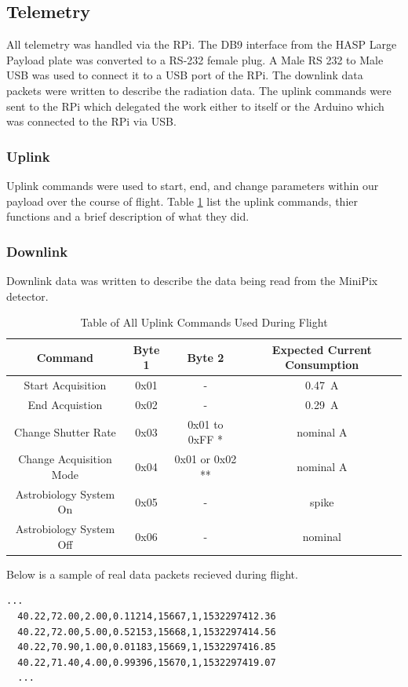\subsection{Telemetry}
\label{sec:Telemetry}

All telemetry was handled via the RPi. The DB9 interface from the HASP Large Payload plate was converted to a 
RS-232 female plug. A Male RS 232 to Male USB was used to connect it to a USB port of the RPi. 
The downlink data packets were written to describe the radiation data. 
The uplink commands were sent to the RPi which delegated the work either to itself or the Arduino which 
was connected to the RPi via USB.

\subsubsection{Uplink}
\label{sec:Uplink} 
Uplink commands were used to start, end, and change parameters within our payload over the course of flight. 
Table \ref{tab:All-Commands} list the uplink commands, thier functions and a brief description of what they did. 

\subsubsection{Downlink}
\label{sec:Downlink}
Downlink data was written to describe the data being read from the MiniPix detector. 

\begin{table}[h!]
\centering
\caption{Table of All Uplink Commands Used During Flight}
\label{tab:All-Commands}
\bigskip
\begin{tabular}{c|c|c|c}
\hline
\hline
\multicolumn{1}{c|}{\bfseries Command} & \multicolumn{1}{c|}{\bfseries Byte 1} &  \multicolumn{1}{c|}{\bfseries Byte 2} & \multicolumn{1}{c}{\bfseries Expected Current Consumption} \\
\hline
	Start Acquisition  		& 0x01	& -	 				& \SI{0.47}{\ampere}    \\ \hline
	End Acquistion 			& 0x02	& -	 				& \SI{0.29}{\ampere}    \\ \hline
	Change Shutter Rate 	& 0x03 	& 0x01 to 0xFF *	& nominal A 		\\ \hline
	Change Acquisition Mode	& 0x04	& 0x01 or 0x02 **	& nominal A		\\ \hline
	Astrobiology System On	& 0x05	& -					& spike			\\ \hline
	Astrobiology System Off	& 0x06	& -					& nominal		\\ \hline
\end{tabular}
\medskip
\end{table}

Below is a sample of real data packets recieved during flight. 

\lstset{basicstyle=\small, numbers=left, xleftmargin=2em, frame=tb, label = Downlinks, framexleftmargin=1.5em}
\begin{lstlisting}[caption = Sample of downlinked data packets ID: 15667 - 15670.]
  ...
  40.22,72.00,2.00,0.11214,15667,1,1532297412.36
  40.22,72.00,5.00,0.52153,15668,1,1532297414.56
  40.22,70.90,1.00,0.01183,15669,1,1532297416.85
  40.22,71.40,4.00,0.99396,15670,1,1532297419.07
  ...
\end{lstlisting}
